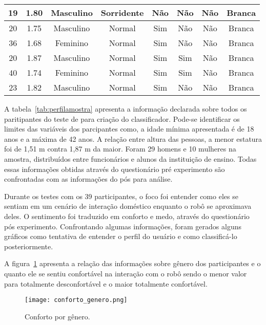\begin{table}[!ht]
\begin{tabular}{c | c | c | c | c | c | c | c}
        \hline
        19 & 1.80 & Masculino & Sorridente & Não & Não & Não & Branca \\
        \hline
        20 & 1.75 & Masculino & Normal & Sim & Não & Não & Branca \\
        \hline
        36 & 1.68 & Feminino & Normal & Sim & Não & Não & Branca \\
        \hline
        20 & 1.87 & Masculino & Normal & Sim & Sim & Não & Branca \\
        \hline
        40 & 1.74 & Feminino & Normal & Sim & Sim & Não & Branca \\
        \hline
        23 & 1.82 & Masculino & Normal & Sim & Não & Não & Branca \\
        \hline
	\end{tabular}
\end{table}

A tabela~\ref{tab:perfilamostra} apresenta a informação declarada sobre todos os paritipantes do teste de para criação do classificador. Pode-se identificar os limites das variáveis dos parcipantes como, a idade mínima apresentada é de 18 anos e a máxima de 42 anos. A relação entre altura das pessoas, a menor estatura foi de 1,51 m contra 1,87 m da maior. Foram 29 homens e 10 mulheres na amostra, distribuídos entre funcionários e alunos da instituição de ensino. Todas essas informações obtidas através do questionário pré experimento são confrontadas com as informações do pós para análise.

Durante os testes com os 39 participantes, o foco foi entender como eles se sentiam em um cenário de interação doméstico enquanto o robô se aproximava deles. O sentimento foi traduzido em conforto e medo, através do questionário pós experimento. Confrontando algumas informações, foram gerados alguns gráficos como tentativa de entender o perfil do usuário e como classificá-lo posteriormente.

A figura~\ref{fig:confortogenero} apresenta a relação das informações sobre gênero dos participantes e o quanto ele se sentiu confortável na interação com o robô sendo o menor valor para totalmente desconfortável e o maior totalmente confortável.

\begin{figure}[ht!]
	\centering
	\begin{minipage}{0.65\textwidth}
		\caption{Conforto por gênero.}
		\texttt{[image: conforto\_genero.png]}
		\label{fig:confortogenero}
	\end{minipage}
\end{figure}

